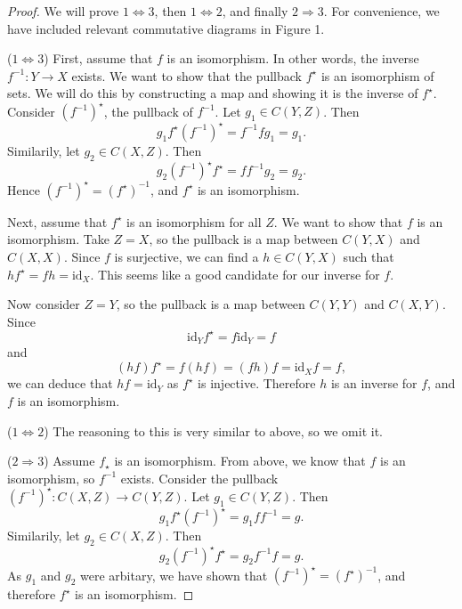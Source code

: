 \documentclass[12pt]{article}
\theoremstyle{theorem}
\begin{document}
\begin{proof}
  We will prove $1 \Leftrightarrow 3$, then $1 \Leftrightarrow 2$, and finally $2\Rightarrow 3$. For convenience, we have included relevant commutative diagrams in Figure 1.

  ($1\Leftrightarrow 3$) First, assume that $f$ is an isomorphism. In other words, the inverse $f^{-1}:Y\to X$ exists. We want to show that the pullback $f^\star$ is an isomorphism of sets. We will do this by constructing a map and showing it is the inverse of $f^\star$. Consider $(f^{-1})^\star$, the pullback of $f^{-1}$. Let $g_1\in C(Y,Z)$. Then $$g_1f^\star(f^{-1})^\star=f^{-1}fg_1=g_1.$$ Similarily, let $g_2\in C(X,Z)$. Then $$g_2(f^{-1})^\star f^\star=ff^{-1}g_2=g_2.$$ Hence $(f^{-1})^\star=(f^\star)^{-1}$, and $f^\star$ is an isomorphism.

  Next, assume that $f^\star$ is an isomorphism for all $Z$. We want to show that $f$ is an isomorphism. Take $Z=X$, so the pullback is a map between $C(Y,X)$ and $C(X,X)$. Since $f$ is surjective, we can find a $h\in C(Y,X)$ such that $hf^\star = fh = \textrm{id}_X$. This seems like a good candidate for our inverse for $f$.
  
  Now consider $Z=Y$, so the pullback is a map between $C(Y,Y)$ and $C(X,Y)$. Since $$\textrm{id}_Yf^\star = f\textrm{id}_Y =f$$ and $$(hf)f^\star =f(hf)=(fh)f=\textrm{id}_X f = f,$$ we can deduce that $hf=\textrm{id}_Y$ as $f^\star$ is injective. Therefore $h$ is an inverse for $f$, and $f$ is an isomorphism.

  ($1\Leftrightarrow 2$) The reasoning to this is very similar to above, so we omit it.
  
  ($2\Rightarrow 3$) Assume $f_\star$ is an isomorphism. From above, we know that $f$ is an isomorphism, so $f^{-1}$ exists. Consider the pullback $(f^{-1})^\star:C(X,Z)\to C(Y,Z)$. Let $g_1\in C(Y,Z)$. Then $$g_1f^\star(f^{-1})^\star=g_1ff^{-1}=g.$$ Similarily, let $g_2\in C(X,Z)$. Then $$g_2(f^{-1})^\star f^\star = g_2f^{-1}f = g.$$ As $g_1$ and $g_2$ were arbitary, we have shown that $(f^{-1})^\star =(f^\star)^{-1}$, and therefore $f^\star$ is an isomorphism.

\end{proof}
\end{document}
